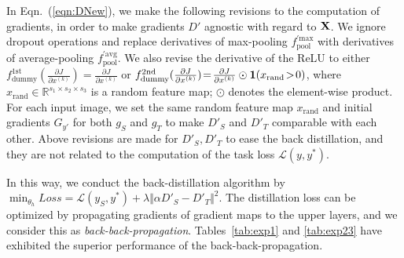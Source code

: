 \documentclass[10pt,twocolumn,letterpaper]{article}
\begin{document}
In Eqn.~(\ref{eqn:DNew}), we make the following revisions to the computation of gradients, in order to make gradients {\small$D'$} agnostic with regard to {\small${\bf X}$}. We ignore dropout operations and replace derivatives of max-pooling {\small$f_{\textrm{pool}}^{'\textrm{max}}$} with derivatives of average-pooling {\small$f_{\textrm{pool}}^{'\textrm{avg}}$}. We also revise the derivative of the ReLU to either {\small$f^{\textrm{1st}}_{\textrm{dummy}}(\frac{\partial J}{\partial x^{(k)}})\!=\!\frac{\partial J}{\partial x^{(k)}}$} or {\small$f^{\textrm{2nd}}_{\textrm{dummy}}(\frac{\partial J}{\partial x^{(k)}})\!=\!\frac{\partial J}{\partial x^{(k)}}\odot{\bf1}(x_{\textrm{rand}}\!>\!0)$}, where {\small$x_{\textrm{rand}}\!\in\!\mathbb{R}^{s_1\times s_2\times s_3}$} is a random feature map; $\odot$ denotes the element-wise product. For each input image, we set the same random feature map {\small$x_{\textrm{rand}}$} and initial gradients {\small$G_{y'}$} for both {\small$g_{S}$} and {\small$g_{T}$} to make {\small$D'_{S}$} and {\small$D'_{T}$} comparable with each other. Above revisions are made for {\small$D'_{S},D'_{T}$} to ease the back distillation, and they are not related to the computation of the task loss {\small$\mathcal{L}(y,y^{*})$}.



In this way, we conduct the back-distillation algorithm by {\small$\min_{\theta_{h}}Loss\!=\!\mathcal{L}(y_{S},y^{*})\!+\!\lambda\Vert\alpha D'_{S}\!-\!D'_{T}\Vert^2$}. The distillation loss can be optimized by propagating gradients of gradient maps to the upper layers, and we consider this as \textit{back-back-propagation}\textcolor{red}{\footnotemark[1]}. Tables~\ref{tab:exp1} and \ref{tab:exp23} have exhibited the superior performance of the back-back-propagation.
\end{document}
